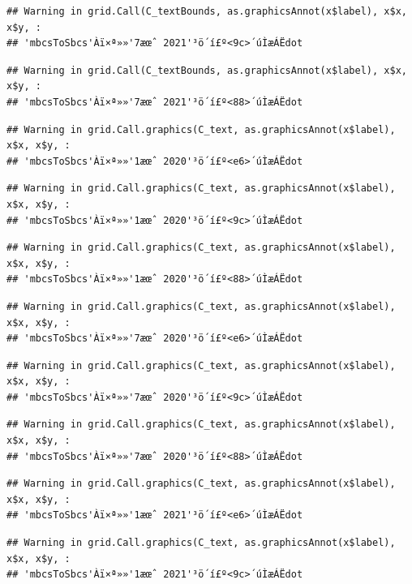 \documentclass[
]{book}
\begin{document}
\begin{verbatim}
## Warning in grid.Call(C_textBounds, as.graphicsAnnot(x$label), x$x, x$y, :
## 'mbcsToSbcs'Àï×ª»»'7æœˆ 2021'³ö´í£º<9c>´úÌæÁËdot
\end{verbatim}

\begin{verbatim}
## Warning in grid.Call(C_textBounds, as.graphicsAnnot(x$label), x$x, x$y, :
## 'mbcsToSbcs'Àï×ª»»'7æœˆ 2021'³ö´í£º<88>´úÌæÁËdot
\end{verbatim}

\begin{verbatim}
## Warning in grid.Call.graphics(C_text, as.graphicsAnnot(x$label), x$x, x$y, :
## 'mbcsToSbcs'Àï×ª»»'1æœˆ 2020'³ö´í£º<e6>´úÌæÁËdot
\end{verbatim}

\begin{verbatim}
## Warning in grid.Call.graphics(C_text, as.graphicsAnnot(x$label), x$x, x$y, :
## 'mbcsToSbcs'Àï×ª»»'1æœˆ 2020'³ö´í£º<9c>´úÌæÁËdot
\end{verbatim}

\begin{verbatim}
## Warning in grid.Call.graphics(C_text, as.graphicsAnnot(x$label), x$x, x$y, :
## 'mbcsToSbcs'Àï×ª»»'1æœˆ 2020'³ö´í£º<88>´úÌæÁËdot
\end{verbatim}

\begin{verbatim}
## Warning in grid.Call.graphics(C_text, as.graphicsAnnot(x$label), x$x, x$y, :
## 'mbcsToSbcs'Àï×ª»»'7æœˆ 2020'³ö´í£º<e6>´úÌæÁËdot
\end{verbatim}

\begin{verbatim}
## Warning in grid.Call.graphics(C_text, as.graphicsAnnot(x$label), x$x, x$y, :
## 'mbcsToSbcs'Àï×ª»»'7æœˆ 2020'³ö´í£º<9c>´úÌæÁËdot
\end{verbatim}

\begin{verbatim}
## Warning in grid.Call.graphics(C_text, as.graphicsAnnot(x$label), x$x, x$y, :
## 'mbcsToSbcs'Àï×ª»»'7æœˆ 2020'³ö´í£º<88>´úÌæÁËdot
\end{verbatim}

\begin{verbatim}
## Warning in grid.Call.graphics(C_text, as.graphicsAnnot(x$label), x$x, x$y, :
## 'mbcsToSbcs'Àï×ª»»'1æœˆ 2021'³ö´í£º<e6>´úÌæÁËdot
\end{verbatim}

\begin{verbatim}
## Warning in grid.Call.graphics(C_text, as.graphicsAnnot(x$label), x$x, x$y, :
## 'mbcsToSbcs'Àï×ª»»'1æœˆ 2021'³ö´í£º<9c>´úÌæÁËdot
\end{verbatim}
\end{document}
